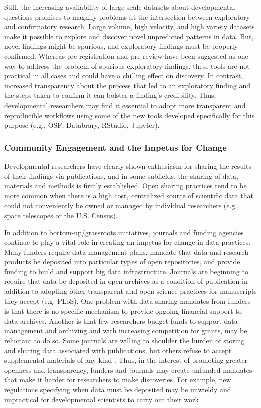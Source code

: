 \documentclass[letterpaper,man,apacite,natbib]{apa6}
\begin{document}
Still, the increasing availability of large-scale datasets about developmental questions promises to magnify problems at the intersection between exploratory and confirmatory research.
Large volume, high velocity, and high variety datasets make it possible to explore and discover novel unpredicted patterns in data.
But, novel findings might be spurious, and exploratory findings must be properly confirmed.
Whereas pre-registration and pre-review have been suggested as one way to address the problem of spurious exploratory findings, these tools are not practical in all cases and could have a chilling effect on discovery.
In contrast, increased transparency about the process that led to an exploratory finding and the steps taken to confirm it can bolster a finding's credibility.
Thus, developmental researchers may find it essential to adopt more transparent and reproducible workflows using some of the new tools developed specifically for this purpose (e.g., OSF, Databrary, RStudio, Jupyter).
\subsubsection{Community Engagement and the Impetus for Change}
Developmental researchers have clearly shown enthusiasm for sharing the results of their findings via publications, and in some subfields, the sharing of data, materials and methods is firmly established.
Open sharing practices tend to be more common when there is a high cost, centralized source of scientific data that could not conveniently be owned or managed by individual researchers (e.g., space telescopes or the U.S. Census).

In addition to bottom-up/grassroots initiatives, journals and funding agencies continue to play a vital role in creating an impetus for change in data practices.
Many funders require data management plans, mandate that data and research products be deposited into particular types of open repositories, and provide funding to build and support big data infrastructure.
Journals are beginning to require that data be deposited in open archives as a condition of publication in addition to adopting other transparent and open science practices for manuscripts they accept (e.g. PLoS).
One problem with data sharing mandates from funders is that there is no specific mechanism to provide ongoing financial support to data archives.
Another is that few researchers budget funds to support data management and archiving and with increasing competition for grants, may be reluctant to do so.
Some journals are willing to shoulder the burden of storing and sharing data associated with publications, but others refuse to accept supplemental materials of any kind \cite{maunsell_announcement_2010}.
Thus, in the interest of promoting greater openness and transparency, funders and journals may create unfunded mandates that make it harder for researchers to make discoveries.
For example, new regulations specifying when data must be deposited may be unwieldy and impractical for developmental scientists to carry out their work \cite{eisenberg_thoughts_2015, apa_data_sharing_work_group_data_2015}.
\end{document}
